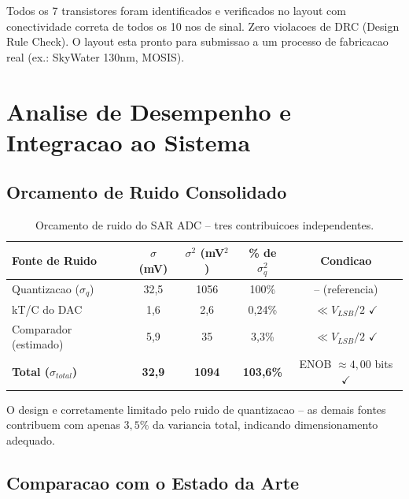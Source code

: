 \documentclass[12pt, a4paper]{article}
\begin{document}
\begin{resultadobox}
Todos os 7 transistores foram identificados e verificados no layout com conectividade
correta de todos os 10 nos de sinal. Zero violacoes de DRC (Design Rule Check). O layout
esta pronto para submissao a um processo de fabricacao real (ex.: SkyWater 130nm, MOSIS).
\end{resultadobox}

\section{Analise de Desempenho e Integracao ao Sistema}

\subsection{Orcamento de Ruido Consolidado}

\begin{table}[H]
\centering
\caption{Orcamento de ruido do SAR ADC -- tres contribuicoes independentes.}
\label{tab:noise}
\begin{tabular}{lcccc}
\toprule
\textbf{Fonte de Ruido} & $\sigma$ (mV) & $\sigma^2$ (mV$^2$) & \% de $\sigma_q^2$ & \textbf{Condicao}\\
\midrule
Quantizacao ($\sigma_q$)    & 32,5 & 1056 & 100\% & -- (referencia) \\
kT/C do DAC                 & 1,6  & 2,6  & 0,24\% & $\ll V_{LSB}/2$ $\checkmark$ \\
Comparador (estimado)       & 5,9  & 35   & 3,3\%  & $\ll V_{LSB}/2$ $\checkmark$ \\
\midrule
\textbf{Total ($\sigma_{total}$)} & \textbf{32,9} & \textbf{1094} & \textbf{103,6\%} & ENOB $\approx 4{,}00$ bits $\checkmark$ \\
\bottomrule
\end{tabular}
\end{table}

O design e corretamente limitado pelo ruido de quantizacao -- as demais fontes contribuem
com apenas $3{,}5\%$ da variancia total, indicando dimensionamento adequado.

\subsection{Comparacao com o Estado da Arte}
\end{document}
